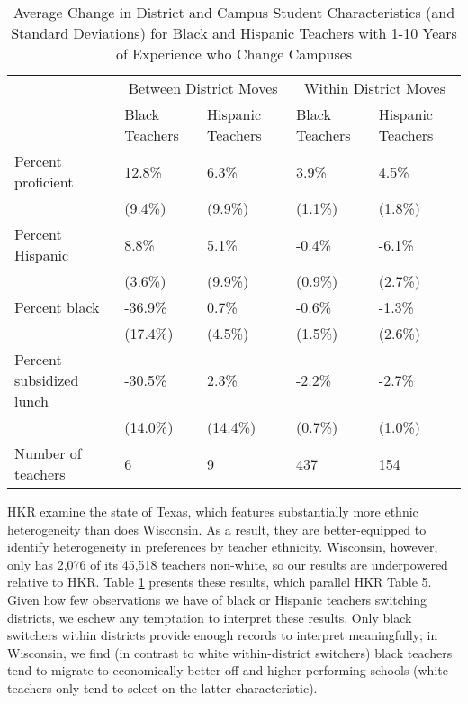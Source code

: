 \documentclass[]{article}
\begin{document}
\begin{table}[htbp]
\centering
\begin{tabular}{lp{}p{}p{}p{}}
  \hline
 & \multicolumn{2}{c}{Between District Moves} & \multicolumn{2}{c}{Within District Moves}\\ \cline{2-5}
 & Black Teachers & Hispanic Teachers & Black Teachers & Hispanic Teachers \\
  \hline
Percent proficient & 12.8\% & 6.3\% & 3.9\% & 4.5\% \\ 
   & (9.4\%) & (9.9\%) & (1.1\%) & (1.8\%) \\ 
  Percent Hispanic & 8.8\% & 5.1\% & -0.4\% & -6.1\% \\ 
   & (3.6\%) & (9.9\%) & (0.9\%) & (2.7\%) \\ 
  Percent black & -36.9\% & 0.7\% & -0.6\% & -1.3\% \\ 
   & (17.4\%) & (4.5\%) & (1.5\%) & (2.6\%) \\ 
  Percent subsidized lunch & -30.5\% & 2.3\% & -2.2\% & -2.7\% \\ 
   & (14.0\%) & (14.4\%) & (0.7\%) & (1.0\%) \\ 
  Number of teachers & 6 & 9 & 437 & 154 \\ 
   \hline
\end{tabular}
\caption{Average Change in District and Campus Student Characteristics (and Standard Deviations) for Black and Hispanic Teachers with 1-10 Years of Experience who Change Campuses} 
\label{tbl:change_by_eth}
\end{table}

HKR examine the state of Texas, which features substantially more ethnic
heterogeneity than does Wisconsin. As a result, they are better-equipped
to identify heterogeneity in preferences by teacher ethnicity.
Wisconsin, however, only has 2,076 of its 45,518 teachers non-white, so
our results are underpowered relative to HKR. Table
\ref{tbl:change_by_eth} presents these results, which parallel HKR Table
5. Given how few observations we have of black or Hispanic teachers
switching districts, we eschew any temptation to interpret these
results. Only black switchers within districts provide enough records to
interpret meaningfully; in Wisconsin, we find (in contrast to white
within-district switchers) black teachers tend to migrate to
economically better-off and higher-performing schools (white teachers
only tend to select on the latter characteristic).
\end{document}
